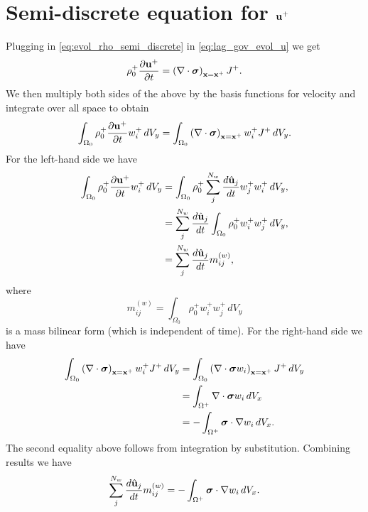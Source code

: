 \documentclass[11pt]{article}
\begin{document}
\section{Semi-discrete equation for $\mathbf{u}^+$}
Plugging in \cref{eq:evol_rho_semi_discrete} in \cref{eq:lag_gov_evol_u} we get
\begin{equation}
    \rho^+_0 \frac{\partial \mathbf{u}^+}{\partial t} = \left ( \nabla \cdot \bm \sigma \right )_{\mathbf{x} = \mathbf{x}^+} J^+.
\end{equation}
We then multiply both sides of the above by the basis functions for velocity and integrate over all space to obtain
\begin{equation}
    \int_{\Omega_0} \rho^+_0 \frac{\partial \mathbf{u}^+}{\partial t} w^+_i \, dV_y = \int_{\Omega_0} \left ( \nabla \cdot \bm \sigma \right )_{\mathbf{x} = \mathbf{x}^+} w^+_i J^+ \, dV_y.
\end{equation}
For the left-hand side we have
\begin{align}
    \int_{\Omega_0} \rho^+_0 \frac{\partial \mathbf{u}^+}{\partial t} w^+_i \, dV_y &= \int_{\Omega_0} \rho^+_0 \sum_j^{N_w} \frac{d \hat{\mathbf{u}}_j}{dt} w^+_j w^+_i \, dV_y, \nonumber \\
    &= \sum_j^{N_w} \frac{d \hat{\mathbf{u}}_j}{dt} \int_{\Omega_0} \rho^+_0 w^+_i w^+_j \, dV_y, \nonumber \\
    &= \sum_j^{N_w} \frac{d \hat{\mathbf{u}}_j}{dt} m_{ij}^{(w)},
\end{align}
where
\begin{equation}
    m_{ij}^{(w)} = \int_{\Omega_0} \rho^+_0 w^+_i w^+_j \, dV_y
\end{equation}
is a mass bilinear form (which is independent of time). For the right-hand side we have
\begin{align}
    \int_{\Omega_0} \left ( \nabla \cdot \bm \sigma \right )_{\mathbf{x} = \mathbf{x}^+} w^+_i J^+ \, dV_y & = \int_{\Omega_0} \left ( \nabla \cdot \bm \sigma w_i \right )_{\mathbf{x} = \mathbf{x}^+} J^+ \, dV_y \nonumber \\
    & = \int_{\Omega^+} \nabla \cdot \bm \sigma w_i \, dV_x \nonumber \\
    & = -\int_{\Omega^+} \bm \sigma \cdot \nabla w_i \, dV_x.
\end{align}
The second equality above follows from integration by substitution. Combining results we have
\begin{equation}
    \label{eq:evol_u_semi_discrete}
    \sum_j^{N_w} \frac{d \hat{\mathbf{u}}_j}{d t} m^{(w)}_{ij} = -\int_{\Omega^+} \bm \sigma \cdot \nabla w_i \, dV_x.
\end{equation}
\end{document}
